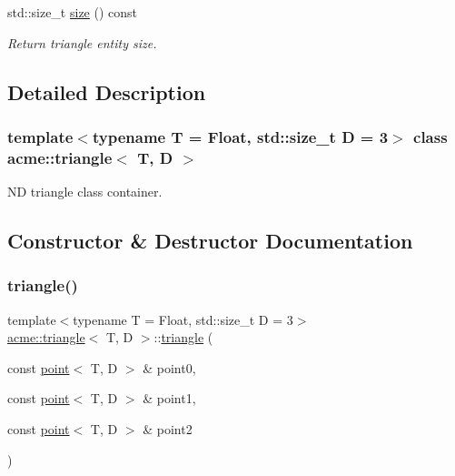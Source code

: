 \begin{DoxyCompactItemize}
\mbox{\label{classacme_1_1triangle_a14f46edd169af3f4ce2aad8b23be4d63}} 
std\+::size\+\_\+t \hyperlink{classacme_1_1triangle_a14f46edd169af3f4ce2aad8b23be4d63}{size} () const
\begin{DoxyCompactList}\small\item\em Return triangle entity size. \end{DoxyCompactList}\end{DoxyCompactItemize}


\subsection{Detailed Description}
\subsubsection*{template$<$typename T = Float, std\+::size\+\_\+t D = 3$>$\newline
class acme\+::triangle$<$ T, D $>$}

ND triangle class container. 

\subsection{Constructor \& Destructor Documentation}
\mbox{\label{classacme_1_1triangle_a53f6b787605b71b5420ce6524acfecfd}} 
\subsubsection{\texorpdfstring{triangle()}{triangle()}}
{\footnotesize\ttfamily template$<$typename T = Float, std\+::size\+\_\+t D = 3$>$ \\
\hyperlink{classacme_1_1triangle}{acme\+::triangle}$<$ T, D $>$\+::\hyperlink{classacme_1_1triangle}{triangle} (\begin{DoxyParamCaption}\item[{const \hyperlink{classacme_1_1point}{point}$<$ T, D $>$ \&}]{point0,  }\item[{const \hyperlink{classacme_1_1point}{point}$<$ T, D $>$ \&}]{point1,  }\item[{const \hyperlink{classacme_1_1point}{point}$<$ T, D $>$ \&}]{point2 }\end{DoxyParamCaption})\hspace{0.3cm}{\ttfamily [inline]}}



